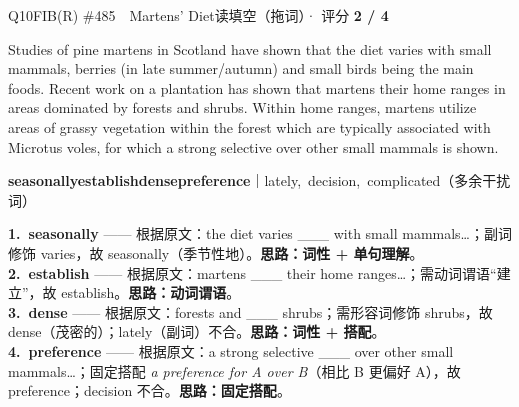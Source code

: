 \begin{qblock}{Q10\quad FIB(R) \#485\ \ Martens' Diet}{读填空（拖词）· 评分 \textcolor{cAccent}{\bfseries 2 / 4}}
\begin{promptbox}
Studies of pine martens in Scotland have shown that the diet varies  with small mammals, berries (in late summer/autumn) and small birds being the main foods. Recent work on a plantation has shown that martens  their home ranges in areas dominated by forests and  shrubs. Within home ranges, martens utilize areas of grassy vegetation within the forest which are typically associated with Microtus voles, for which a strong selective  over other small mammals is shown.
\end{promptbox}
{\small \textbf{seasonally}\quad \textbf{establish}\quad \textbf{dense}\quad \textbf{preference}\quad ｜\quad lately,\ decision,\ complicated（多余干扰词）}
\begin{notebox}\footnotesize
\textbf{1.\ seasonally} —— 根据原文：the diet varies \_\_\_ with small mammals…；副词修饰 varies，故 seasonally（季节性地）。\textbf{思路：词性 + 单句理解}。\\[2pt]
\textbf{2.\ establish} —— 根据原文：martens \_\_\_ their home ranges…；需动词谓语“建立”，故 establish。\textbf{思路：动词谓语}。\\[2pt]
\textbf{3.\ dense} —— 根据原文：forests and \_\_\_ shrubs；需形容词修饰 shrubs，故 dense（茂密的）；lately（副词）不合。\textbf{思路：词性 + 搭配}。\\[2pt]
\textbf{4.\ preference} —— 根据原文：a strong selective \_\_\_ over other small mammals…；固定搭配 \emph{a preference for A over B}（相比 B 更偏好 A），故 preference；decision 不合。\textbf{思路：固定搭配}。
\end{notebox}
\end{qblock}

